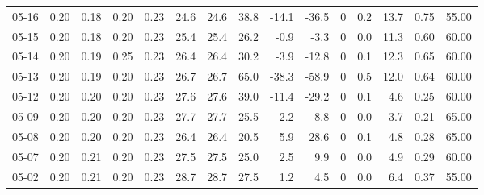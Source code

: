 \begin{threeparttable}
{\begin{tabular}{lrrrrrrrrrrrrrr}
  05-16 &          0.20 &          0.18 &          0.20 &        0.23 &                24.6 &               24.6 &                38.8 &      -14.1 &        -36.5 &              0 &                 0.2 &             13.7 &            0.75 &                  55.00 \\
  05-15 &          0.20 &          0.18 &          0.20 &        0.23 &                25.4 &               25.4 &                26.2 &       -0.9 &         -3.3 &              0 &                 0.0 &             11.3 &            0.60 &                  60.00 \\
  05-14 &          0.20 &          0.19 &          0.25 &        0.23 &                26.4 &               26.4 &                30.2 &       -3.9 &        -12.8 &              0 &                 0.1 &             12.3 &            0.65 &                  60.00 \\
  05-13 &          0.20 &          0.19 &          0.20 &        0.23 &                26.7 &               26.7 &                65.0 &      -38.3 &        -58.9 &              0 &                 0.5 &             12.0 &            0.64 &                  60.00 \\
  05-12 &          0.20 &          0.20 &          0.20 &        0.23 &                27.6 &               27.6 &                39.0 &      -11.4 &        -29.2 &              0 &                 0.1 &              4.6 &            0.25 &                  60.00 \\
  05-09 &          0.20 &          0.20 &          0.20 &        0.23 &                27.7 &               27.7 &                25.5 &        2.2 &          8.8 &              0 &                 0.0 &              3.7 &            0.21 &                  65.00 \\
  05-08 &          0.20 &          0.20 &          0.20 &        0.23 &                26.4 &               26.4 &                20.5 &        5.9 &         28.6 &              0 &                 0.1 &              4.8 &            0.28 &                  65.00 \\
  05-07 &          0.20 &          0.21 &          0.20 &        0.23 &                27.5 &               27.5 &                25.0 &        2.5 &          9.9 &              0 &                 0.0 &              4.9 &            0.29 &                  60.00 \\
  05-02 &          0.20 &          0.21 &          0.20 &        0.23 &                28.7 &               28.7 &                27.5 &        1.2 &          4.5 &              0 &                 0.0 &              6.4 &            0.37 &                  55.00 \\

\end{tabular}}
\end{threeparttable}
